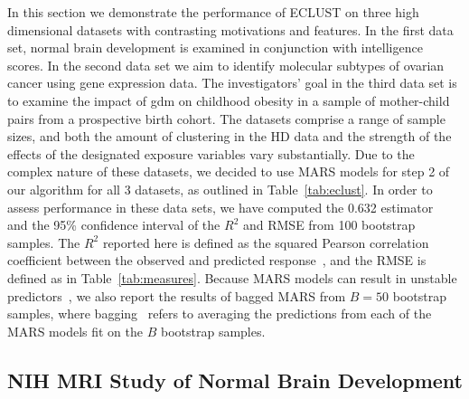 In this section we demonstrate the performance of ECLUST on three high dimensional datasets with contrasting motivations and features. In the first data set, normal brain development is examined in conjunction with intelligence scores. In the second data set we aim to identify molecular subtypes of ovarian cancer using gene expression data. The investigators' goal in the third data set is to examine the impact of \ac{gdm} on childhood obesity in a sample of mother-child pairs from a prospective birth cohort. The datasets comprise a range of sample sizes, and both the amount of clustering in the HD data and the strength of the effects of the designated exposure variables vary substantially.  Due to the complex nature of these datasets, we decided to use MARS models for step 2 of our algorithm for all 3 datasets, as outlined in Table~\ref{tab:eclust}. In order to assess performance in these data sets, we have computed the 0.632 estimator~\citep{efron1983estimating} and the 95\% confidence interval of the $R^2$ and RMSE from 100 bootstrap samples. The $R^2$ reported here is defined as the squared Pearson correlation coefficient between the observed and predicted response~\citep{kvaalseth1985cautionary}, and the RMSE is defined as in Table~\ref{tab:measures}. Because MARS models can result in unstable predictors~\citep{kuhn2008caret}, we also report the results of bagged MARS from $B=50$ bootstrap samples, where bagging~\citep{breiman1996bagging} refers to averaging the predictions from each of the MARS models fit on the $B$ bootstrap samples. 


\subsection{NIH MRI Study of Normal Brain Development} \label{sec:nih}

